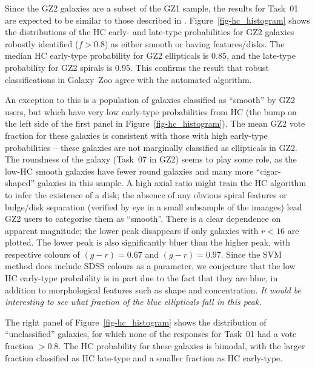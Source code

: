\documentclass[useAMS,usenatbib]{mn2e}
\begin{document}
Since the GZ2 galaxies are a subset of the GZ1 sample, the results for Task~01 are expected to be similar to those described in \citet{hue11}. Figure~\ref{fig-hc_histogram} shows the distributions of the HC early- and late-type probabilities for GZ2 galaxies robustly identified ($f>0.8$) as either smooth or having features/disks. The median HC early-type probability for GZ2 ellipticals is 0.85, and the late-type probability for GZ2 spirals is 0.95. This confirms the result that robust classifications in Galaxy~Zoo agree with the automated algorithm. 

An exception to this is a population of galaxies classified as ``smooth'' by GZ2 users, but which have very low early-type probabilities from HC (the bump on the left side of the first panel in Figure~\ref{fig-hc_histogram}). The mean GZ2 vote fraction for these galaxies is consistent with those with high early-type probabilities -- these galaxies are not marginally classified as ellipticals in GZ2. The roundness of the galaxy (Task~07 in GZ2) seems to play some role, as the low-HC smooth galaxies have fewer round galaxies and many more ``cigar-shaped'' galaxies in this sample. A high axial ratio might train the HC algorithm to infer the existence of a disk; the absence of any obvious spiral features or bulge/disk separation (verified by eye in a small subsample of the imaages) lead GZ2 users to categorise them as ``smooth''. There is a clear dependence on apparent magnitude; the lower peak disappears if only galaxies with $r<16$ are plotted. The lower peak is also significantly bluer than the higher peak, with respective colours of $(g-r)=0.67$ and $(g-r)=0.97$. Since the SVM method does include SDSS colours as a parameter, we conjecture that the low HC early-type probability is in part due to the fact that they are blue, in addition to morphological features such as shape and concentration. {\em It would be interesting to see what fraction of the blue ellipticals \citep{sch09} fall in this peak.}

The right panel of Figure~\ref{fig-hc_histogram} shows the distribution of ``unclassified'' galaxies, for which none of the responses for Task~01 had a vote fraction $>0.8$. The HC probability for these galaxies is bimodal, with the larger fraction classified as HC late-type and a smaller fraction as HC early-type. 
\end{document}

